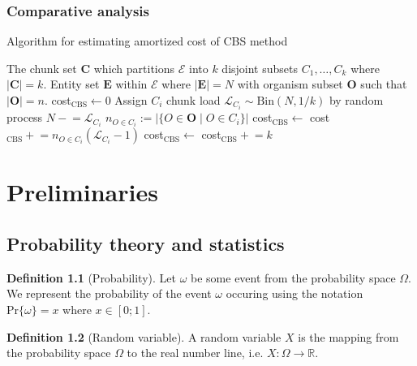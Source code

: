 \documentclass[a4paper, 12pt]{report}
\theoremstyle{definition}
\newtheorem{definition}{Definition}
\begin{document}
\subsection{Comparative analysis}
\begin{algorithm}[ht!]
    \caption{Algorithm for estimating amortized cost of CBS method}
    \begin{algorithmic}[1]
        \Require The chunk set $\mathbf C$ which partitions $\mathscr E$ into $k$ disjoint
        subsets $C_1, \ldots, C_k$ where $|\mathbf C| = k$. Entity set $\mathbf E$ within $\mathscr E$
        where $|\mathbf E| = N$ with organism subset $\mathbf O$ such that $|\mathbf O| = n$.
        \State cost$_{\text{CBS}} \leftarrow 0$ 
            \State Assign $C_i$ chunk load $\mathcal L_{C_i} \sim \text{Bin}(N, 1/k)$ by random process
            \State $N \mathrel{-}= \mathcal L_{C_i}$ 
            \State $n_{O \in C_i} := |\{O \in \mathbf O \mid O \in C_i\}|$ 
            \State cost$_{\text{CBS}} \leftarrow$ cost$_{\text{CBS}} \mathrel{+}= n_{O \in C_i} (\mathcal L_{C_i} - 1)$
        \EndFor
        \State cost$_{\text{CBS}} \leftarrow$ cost$_{\text{CBS}} \mathrel{+}= k$
        \EndProcedure
    \end{algorithmic}
    \label{cbs-costmodel}
\end{algorithm}

\appendix

\newpage

\chapter{Preliminaries}
\section{Probability theory and statistics}
\begin{definition}[Probability]
    Let $\omega$ be some event from the probability space $\Omega$. We represent
    the probability of the event $\omega$ occuring using the notation $\text{Pr}\{\omega\} = x$
    where $x \in [0;1]$.
\end{definition}

\begin{definition}[Random variable]
    A random variable $X$ is the mapping from the probability space $\Omega$ to the real number
    line, i.e. $X: \Omega \to \mathbb R$.
\end{definition}
\end{document}
